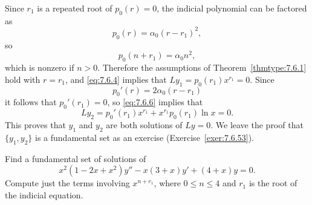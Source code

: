 \proof Since $r_{1}$ is a repeated root of $p_{0}(r)=0$, the indicial polynomial can be factored as
\[
  p_{0}(r)=\alpha_{0}(r-r_{1})^{2},
\]
so
\[
  p_{0}(n+r_{1})=\alpha_{0}n^{2},
\]
which is nonzero if $n>0$. Therefore the assumptions of Theorem~\ref{thmtype:7.6.1} hold with
$r=r_{1}$, and \eqref{eq:7.6.4} implies that $Ly_{1}=p_{0}(r_{1})x^{r_{1}}=0$. Since
\[
  p_{0}'(r)=2\alpha_{0}(r-r_{1})
\]
it follows that $p_{0}'(r_{1})=0$, so \eqref{eq:7.6.6} implies that
\[
  Ly_{2}=p_{0}'(r_{1})x^{r_{1}}+x^{r_{1}}p_{0}(r_{1})\ln x=0.
\]
This proves that $y_{1}$ and $y_{2}$ are both solutions of $Ly=0$. We leave the proof that
$\{y_{1},y_{2}\}$ is a fundamental set as an exercise (Exercise~\ref{exer:7.6.53}).

\begin{example}
  \label{example:7.6.1} \rm Find a fundamental set of solutions of
  \begin{equation}
    \label{eq:7.6.9}x^{2}(1-2x+x^{2})y''-x(3+x)y'+(4+x)y=0.
  \end{equation}
  Compute just the terms involving $x^{n+r_{1}}$, where $0\le n\le4$ and $r_{1}$ is the root of the
  indicial equation.
\end{example}

